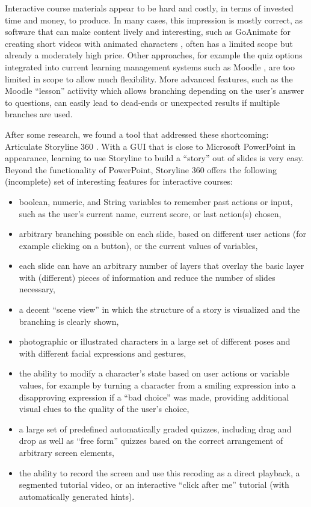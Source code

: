 \documentclass[sigconf]{acmart}
\begin{document}
Interactive course materials appear to be hard and costly, in terms of invested time and money, to
produce. In many cases, this impression is mostly correct, as software that can make content lively
and interesting, such as GoAnimate for creating short videos with animated characters \cite{GoAnimate},
often has a limited scope but already a moderately high price. Other approaches, for example the quiz options
integrated into current learning management systems such as Moodle \cite{Moodle}, are too limited in
scope to allow much flexibility. More advanced features, such as the Moodle ``lesson'' actiivity which
allows branching depending on the user's answer to questions, can easily lead to dead-ends or unexpected
results if multiple branches are used.

After some research, we found a tool that addressed these shortcoming: Articulate Storyline
360 \cite{Storyline}. With a GUI that is close to Microsoft PowerPoint in appearance, learning to use
Storyline to build a ``story'' out of slides is very easy. Beyond the functionality of PowerPoint, Storyline 360
offers the following (incomplete) set of interesting features for interactive courses:

\begin{itemize}
\item boolean, numeric, and String variables to remember past actions or input, such as the user's current 
name, current score, or last action(s) chosen,
\item arbitrary branching possible on each slide, based on different user actions (for example clicking on a button), or the current values of variables,
\item each slide can have an arbitrary number of layers that overlay the basic layer with (different) pieces of
information and reduce the number of slides necessary,
\item a decent ``scene view'' in which the structure of a story is visualized and the branching is clearly
shown,
\item photographic or illustrated characters in a large set of different poses and with different facial expressions and gestures,
\item the ability to modify a character's state based on user actions or variable values, for example by
turning a character from a smiling expression into a disapproving expression if a ``bad choice'' was made,
providing additional visual clues to the quality of the user's choice,
\item a large set of predefined automatically graded quizzes, including drag and drop as well as ``free form''
quizzes based on the correct arrangement of arbitrary screen elements,
\item the ability to record the screen and use this recoding as a direct playback, a segmented tutorial
video, or an interactive ``click after me'' tutorial (with automatically generated hints).
\end{itemize}
\end{document}
